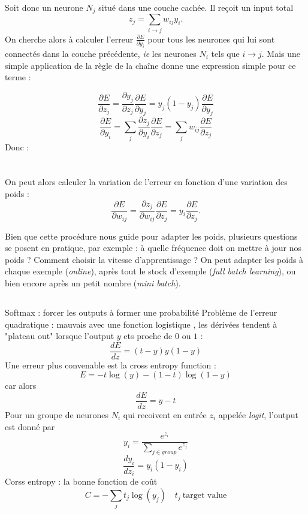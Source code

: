 \documentclass{article}
\begin{document}
Soit donc un neurone $N_j$ situé dans une couche cachée. Il reçoit un input total 
\[z_j=\sum_{i\rightarrow j} w_{ij}y_i.\]
On cherche alors à calculer l'erreur $\frac{\partial E}{\partial y_i}$ pour tous les neurones qui lui sont connectés dans la couche précédente, \textit{ie} les neurones $N_i$ tels que $i\rightarrow j$. Mais une simple application de la règle de la chaîne donne une expression simple pour ce terme :

\[\frac{\partial E}{\partial z_j}=\frac{\partial y_j}{\partial z_j}\frac{\partial E}{\partial y_j}=y_j(1-y_j)\frac{\partial E}{\partial y_j}\]
\[\frac{\partial E}{\partial y_i}=\sum_j\frac{\partial z_j}{\partial y_i}\frac{\partial E}{\partial z_j}=\sum_j w_{ij}\frac{\partial E}{\partial z_j}\]
Donc :\\

\\
\\
On peut alors calculer la variation de l'erreur en fonction d'une variation des poids :
\[\frac{\partial E}{\partial w_{ij}}=\frac{\partial z_j}{\partial w_{ij}}\frac{\partial E}{\partial z_j}=y_i\frac{\partial E}{\partial z_j}.\]

Bien que cette procédure nous guide pour adapter les poids, plusieurs questions se posent en pratique, par exemple : à quelle fréquence doit on mettre à jour nos poids ? Comment choisir la vitesse d'apprentissage ? On peut adapter les poids à chaque exemple (\textit{online}), après tout le stock d'exemple (\textit{full batch learning}), ou bien encore après un petit nombre (\textit{mini batch}).\\

\subsection{}
Softmax : forcer les outputs à former une probabilité
Problème de l'erreur quadratique : mauvais avec une fonction logistique , les dérivées tendent à "plateau out" lorsque l'output $y$ ets proche de $0$ ou $1$ : 
\[\frac{dE}{dz}=(t-y)y(1-y)\]
Une erreur plus convenable est la cross entropy function :
\[E=-t\log(y)-(1-t)\log(1-y)\] 
car alors \[\frac{dE}{dz}=y-t\]
Pour un groupe de neurones $N_i$ qui recoivent en entrée $z_i$ appelée \textit{logit}, l'output est donné par 
\[y_i=\frac{e^{z_i}}{\sum_{j\in group} e^{z_j}}\]
\[\frac{dy_i}{dz_i}=y_i(1-y_i)\]
Corss entropy : la bonne fonction de coût \[C=-\sum_j t_j \log(y_j)\quad t_j \ \text{target value}\]
\end{document}
